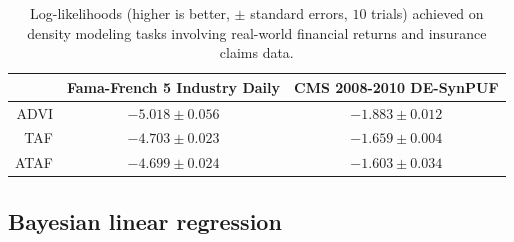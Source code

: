 \documentclass[twoside]{article}
\theoremstyle{definition}
\theoremstyle{remark}
\begin{document}
\begin{table}[htbp]
    \centering
    \begin{tabular}{rcc}
        \toprule
                  & Fama-French 5 Industry Daily & CMS 2008-2010 DE-SynPUF       \\
        \midrule
        ADVI      & $-5.018 \pm 0.056$    & $-1.883 \pm 0.012$ \\
        TAF       & $-4.703 \pm 0.023$    & $-1.659 \pm 0.004$ \\
        ATAF      & $-4.699 \pm 0.024$    & $-1.603 \pm 0.034$ \\
        \bottomrule
    \end{tabular}
    \caption{
        Log-likelihoods (higher is better, $\pm$ standard errors, $10$ trials) achieved on
        density modeling tasks involving real-world financial returns \citep{fama2015five} and insurance claims \citep{cms} data. 
    }
    \label{tab:density-estimation}
\end{table}



\subsection{Bayesian linear regression}
\end{document}
